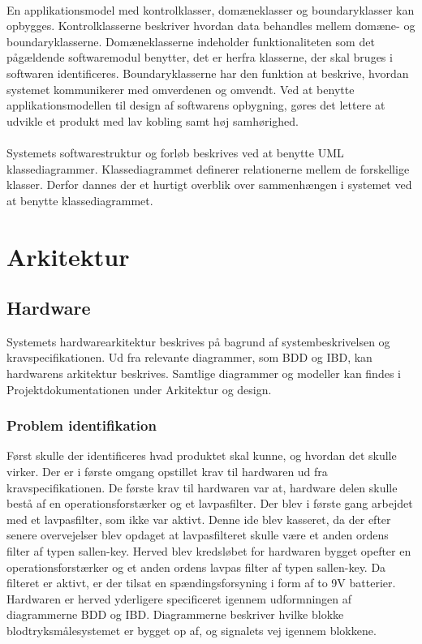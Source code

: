\\
En applikationsmodel med kontrolklasser, domæneklasser og boundaryklasser kan opbygges. Kontrolklasserne beskriver hvordan data behandles mellem domæne- og boundaryklasserne. Domæneklasserne indeholder funktionaliteten som det pågældende softwaremodul benytter, det er herfra klasserne, der skal bruges i softwaren identificeres. Boundaryklasserne har den funktion at beskrive, hvordan systemet kommunikerer med omverdenen og omvendt. Ved at benytte applikationsmodellen til design af softwarens opbygning, gøres det lettere at udvikle et produkt med lav kobling samt høj samhørighed. \\
\\
Systemets softwarestruktur og forløb beskrives ved at benytte UML klassediagrammer. Klassediagrammet definerer relationerne mellem de forskellige klasser. Derfor dannes der et hurtigt overblik over sammenhængen i systemet ved at benytte klassediagrammet.  
\section{Arkitektur}
\subsection{Hardware}
Systemets hardwarearkitektur beskrives på bagrund af systembeskrivelsen og kravspecifikationen. Ud fra relevante diagrammer, som BDD og IBD, kan hardwarens arkitektur beskrives. Samtlige diagrammer og modeller kan findes i Projektdokumentationen under Arkitektur og design. 
\subsubsection{Problem identifikation}
Først skulle der identificeres hvad produktet skal kunne, og hvordan det skulle virker. Der er i første omgang opstillet krav til hardwaren ud fra kravspecifikationen. De første krav til hardwaren var at, hardware delen skulle bestå af en operationsforstærker og et lavpasfilter. Der blev i første gang arbejdet med et lavpasfilter, som ikke var aktivt.  Denne ide blev kasseret, da der efter senere overvejelser blev opdaget at lavpasfilteret skulle være et anden ordens filter af typen sallen-key.  Herved blev kredsløbet for hardwaren bygget opefter en operationsforstærker og et anden ordens lavpas filter af typen sallen-key. Da filteret er aktivt, er der tilsat en spændingsforsyning i form af to 9V batterier. \\
Hardwaren er herved yderligere specificeret igennem udformningen af diagrammerne BDD og IBD. Diagrammerne beskriver hvilke blokke blodtryksmålesystemet er bygget op af, og signalets vej igennem blokkene.
